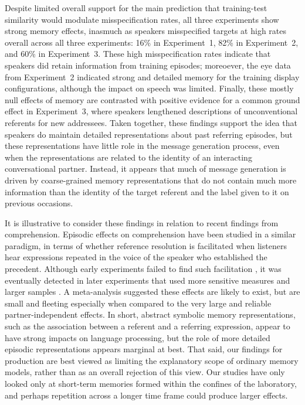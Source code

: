 \documentclass[natbib,man,a4paper]{apa6}
\begin{document}
Despite limited overall support for the main prediction that training-test similarity would modulate misspecification rates, all three experiments show strong memory effects, inasmuch as speakers misspecified targets at high rates overall across all three experiments: 16\% in Experiment~1, 82\% in Experiment~2, and 60\% in Experiment~3.  These high misspecification rates indicate that speakers did retain information from training episodes; moreoever, the eye data from Experiment~2 indicated strong and detailed memory for the training display configurations, although the impact on speech was limited. Finally, these mostly null effects of memory are contrasted with positive evidence for a common ground effect in Experiment~3, where speakers lengthened descriptions of unconventional referents for new addressees. Taken together, these findings support the idea that speakers do maintain detailed representations about past referring episodes, but these representations have little role in the message generation process, even when the representations are related to the identity of an interacting conversational partner.  Instead, it appears that much of message generation is driven by coarse-grained memory representations that do not contain much more information than the identity of the target referent and the label given to it on previous occasions.

It is illustrative to consider these findings in relation to recent findings from comprehension. Episodic effects on comprehension have been studied in a similar paradigm, in terms of whether reference resolution is facilitated when listeners hear expressions repeated in the voice of the speaker who established the precedent. Although early experiments failed to find such facilitation \citep{barrkeysar02,metzingbrennan03}, it was eventually detected in later experiments that used more sensitive measures and larger samples \citep{brown-schmidt09prec}. A meta-analysis suggested these effects are likely to exist, but are small and fleeting \citep{kronmuller_barr_2015} especially when compared to the very large and reliable partner-independent effects. In short, abstract symbolic memory representations, such as the association between a referent and a referring expression, appear to have strong impacts on language processing, but the role of more detailed episodic representations appears marginal at best. That said, our findings for production are best viewed as limiting the explanatory scope of ordinary memory models, rather than as an overall rejection of this view. Our studies have only looked only at short-term memories formed within the confines of the laboratory, and perhaps repetition across a longer time frame could produce larger effects.
\end{document}
